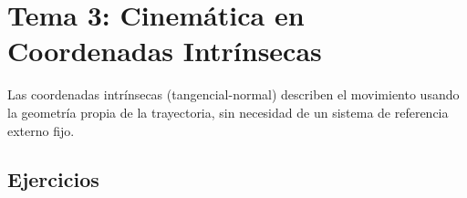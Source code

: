 
\section{Tema 3: Cinemática en Coordenadas Intrínsecas}

Las coordenadas intrínsecas (tangencial-normal) describen el movimiento
usando la geometría propia de la trayectoria, sin necesidad de un sistema
de referencia externo fijo.

\subsection{Ejercicios}


\clearpage

\clearpage

\clearpage

\clearpage
